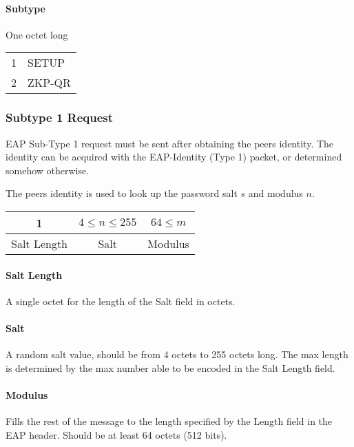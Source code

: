 \paragraph{Subtype} One octet long

\bigskip 

\begin{tabular}{ll}
	1 & SETUP \\ %
	2 & ZKP-QR \\
\end{tabular}

\subsubsection{Subtype 1 Request}

EAP Sub-Type 1 request must be sent after obtaining the peers identity. The identity can be acquired with the EAP-Identity (Type 1) packet, or determined somehow otherwise.

The peers identity is used to look up the password salt $s$ and modulus $n$.

\bigskip

\begin{center}
\begin{tabular}{|c|c|c|}
	\hline
	1 & $4 \le n \le 255 $ & $64 \le m$\\
	\hline
	Salt Length & Salt & Modulus\\
	\hline
\end{tabular}
\end{center}

\paragraph{Salt Length}
A single octet for the length of the Salt field in octets. %

\paragraph{Salt}
A random salt value, should be from 4 octets to 255 octets long.
The max length is determined by the max number able to be encoded in the Salt Length field.

\paragraph{Modulus}
Fills the rest of the message to the length specified by the Length field in the EAP header. %
Should be at least 64 octets (512 bits).

